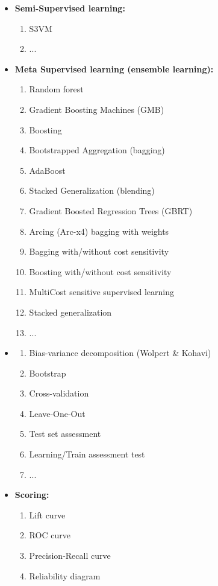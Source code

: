 \begin{itemize}
		\item \textbf{Semi-Supervised learning:}
		\begin{enumerate}
			\item S3VM
			\item ...
		\end{enumerate}
		\item \textbf{Meta Supervised learning (ensemble learning):}
		\begin{enumerate}
			\item Random forest
			\item Gradient Boosting Machines (GMB)
			\item Boosting
			\item Bootstrapped Aggregation (bagging)
			\item AdaBoost
			\item Stacked Generalization (blending)
			\item Gradient Boosted Regression Trees (GBRT)
			\item Arcing (Arc-x4) bagging with weights
			\item Bagging with/without cost sensitivity
			\item Boosting  with/without cost sensitivity
			\item MultiCost sensitive supervised learning
			\item Stacked generalization
			\item ...
		\end{enumerate}
		\item \textbf{}
		\begin{enumerate}
			\item Bias-variance decomposition (Wolpert \& Kohavi)
			\item Bootstrap
			\item Cross-validation
			\item Leave-One-Out
			\item Test set assessment
			\item Learning/Train assessment test
			\item ...
		\end{enumerate}
		\item \textbf{Scoring:}
		\begin{enumerate}
			\item Lift curve
			\item ROC curve
			\item Precision-Recall curve
			\item Reliability diagram

\end{enumerate}
\end{itemize}
